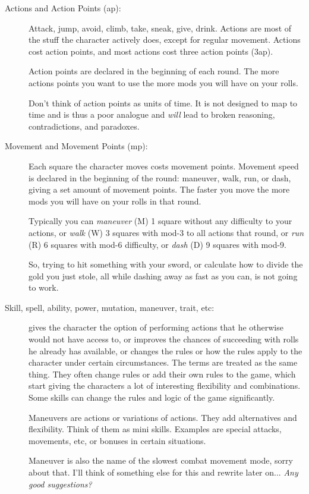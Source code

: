 \begin{description}
\item[Actions and Action Points (ap):]
Attack, jump, avoid, climb, take, sneak, give, drink.
Actions are most of the stuff the character actively does, except for regular movement. Actions cost action points, and most actions cost three action points (3ap).

Action points are declared in the beginning of each round. The more actions points you want to use the more mods you will have on your rolls.

Don't think of action points as units of time. It is not designed to map to time and is thus a poor analogue and \emph{will} lead to broken reasoning, contradictions, and paradoxes.


\item[Movement and Movement Points (mp):]
Each square the character moves costs movement points. Movement speed is declared in the beginning of the round: maneuver, walk, run, or dash, giving a set amount of movement points. The faster you move the more mods you will have on your rolls in that round.

Typically you can \emph{maneuver} (M) 1 square without any difficulty to your actions, or \emph{walk} (W) 3 squares with mod-3 to all actions that round, or \emph{run} (R) 6 squares with mod-6 difficulty, or \emph{dash} (D) 9 squares with mod-9.

So, trying to hit something with your sword, or calculate how to divide the gold you just stole, all while dashing away as fast as you can, is not going to work.


\item[Skill, spell, ability, power, mutation, maneuver, trait, etc:] gives the character the option of performing actions that he otherwise would not have access to, or improves the chances of succeeding with rolls he already has available, or changes the rules or how the rules apply to the character under certain circumstances. The terms are treated as the same thing. They often change rules or add their own rules to the game, which start giving the characters a lot of interesting flexibility and combinations. Some skills can change the rules and logic of the game significantly.

Maneuvers are actions or variations of actions. They add alternatives and flexibility. Think of them as mini skills. Examples are special attacks, movements, etc, or bonuses in certain situations.

\todo Maneuver is also the name of the slowest combat movement mode, sorry about that. I'll think of something else for this and rewrite later on... \emph{Any good suggestions?}



\end{description}
